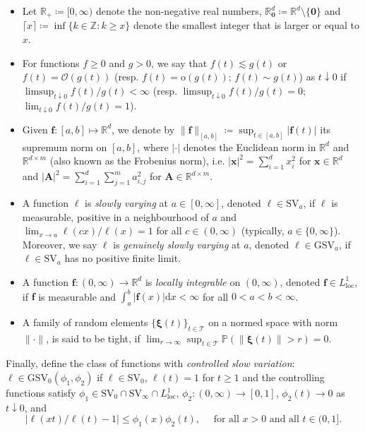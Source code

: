 \documentclass[en,oneside,bbfont,article]{amsart}
\theoremstyle{remark}
\theoremstyle{definition}
\theoremstyle{definition}
\newcommand\Z{\mathbb{Z}}
\newcommand\R{\mathbb{R}}
\newcommand\p{\mathds{P}}
\newcommand\1{\mathds{1}}
\newcommand\Oh{\mathcal{O}}
\newcommand\oh{\mathrm{o}}
\newcommand\SV{\mathrm{SV}}
\newcommand\GSV{\mathrm{GSV}}
\newcommand\da{\downarrow}
\renewcommand\le{\leqslant}
\renewcommand\ge{\geqslant}
\newcommand{\D}{\mathrm{d}}
\newcommand{\Lloc}{L_{\mathrm{loc}}^1}
\begin{document}
\begin{itemize}[leftmargin=1em]
\item Let $\R_+\coloneqq[0,\infty)$ denote the non-negative real numbers, $\R^d_{\bm0}\coloneqq\R^d\setminus\{\bm{0}\}$ and $\lceil x\rceil\coloneqq\inf\{k\in\Z:k\ge x\}$ denote the smallest integer that is larger or equal to $x$.
\item For functions $f\ge 0$ and $g>0$, we say that $f(t) \lesssim g(t)$ or $f(t)=\Oh(g(t))$ (resp. $f(t)=\oh(g(t))$; $f(t)\sim g(t)$) as $t\da 0$ if $\limsup_{t\da 0}f(t)/g(t)<\infty$ (resp. $\limsup_{t\da 0}f(t)/g(t)=0$; $\lim_{t\da 0}f(t)/g(t)=1$). 
\item Given $\bm{f}:[a,b]\mapsto\R^d$, we denote by $\|\bm{f}\|_{[a,b]}\coloneqq\sup_{t\in[a,b]}|\bm{f}(t)|$ its supremum norm on $[a,b]$, where $|\cdot|$ denotes the Euclidean norm in $\R^d$ and $\R^{d\times m}$ (also known as the Frobenius norm), i.e. $|\bm{x}|^2=\sum_{i=1}^d x_i^2$ for $\bm{x} \in \R^d$ and $|\bm{A}|^2=\sum_{i=1}^d \sum_{j=1}^m a_{i,j}^2$ for $\bm{A} \in \R^{d\times m}$. 
\item A function $\ell$ is \emph{slowly varying} at $a\in[0,\infty]$, denoted $\ell \in \SV_a$, if $\ell$ is measurable, positive in a neighbourhood of $a$ and $\lim_{x \to a} \ell(cx)/\ell(x)=1$ for all $c\in(0,\infty)$ (typically, $a\in\{0,\infty\}$). Moreover, we say $\ell$ is \emph{genuinely slowly varying} at $a$, denoted $\ell\in\GSV_a$, if $\ell\in\SV_a$ has no positive finite limit.
\item A function $\bm{f}:(0,\infty)\to\R^d$ is \emph{locally integrable} on $(0,\infty)$, denoted $\bm{f}\in \Lloc$, if $\bm{f}$ is measurable and $\int_a^b |\bm{f}(x)|\D x<\infty$ for all $0<a<b<\infty$.
\item A family of random elements $\{\bm{\xi}(t)\}_{t\in\mathcal{T}}$ on a normed space with norm $\|\cdot\|$, is said to be tight, if $\lim_{r \to \infty} \sup_{t \in \mathcal{T}}\p(\|\bm{\xi}(t)\|>r)=0$. 
\end{itemize}

Finally, define the class of functions with \emph{controlled slow variation}: $\ell\in\GSV_0(\phi_1,\phi_2)$ if $\ell\in\SV_0$, $\ell(t)=1$ for $t\ge 1$ and the controlling functions satisfy $\phi_1\in\SV_0\cap\SV_\infty\cap \Lloc$, $\phi_2:(0,\infty)\to[0,1]$, $\phi_2(t)\to 0$ as $t \da 0$, and
\[
\left|\ell(xt)/\ell(t)-1 \right|
\le \phi_1(x)\phi_2(t), 
\quad \text{ for all }x>0
\text{ and all }t\in (0,1].
\] 
\end{document}
